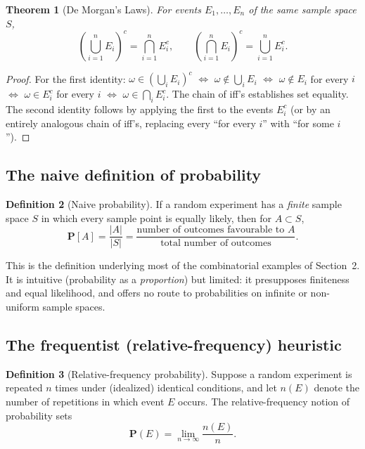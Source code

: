 \documentclass[11pt]{article}
\theoremstyle{definition}
\newtheorem{definition}{Definition}[section]
\theoremstyle{plain}
\newtheorem{theorem}[definition]{Theorem}
\theoremstyle{remark}
\begin{document}
\begin{theorem}[De Morgan's Laws]
For events $E_1,\dots,E_n$ of the same sample space $S$,
\[
\left(\bigcup_{i=1}^n E_i\right)^{\!c} = \bigcap_{i=1}^n E_i^c, \qquad
\left(\bigcap_{i=1}^n E_i\right)^{\!c} = \bigcup_{i=1}^n E_i^c.
\]
\end{theorem}

\begin{proof}
For the first identity: $\omega \in \left(\bigcup_i E_i\right)^c$ $\iff$ $\omega \notin
\bigcup_i E_i$ $\iff$ $\omega \notin E_i$ for every $i$ $\iff$ $\omega \in E_i^c$ for every $i$
$\iff$ $\omega \in \bigcap_i E_i^c$. The chain of iff's establishes set equality. The second
identity follows by applying the first to the events $E_i^c$ (or by an entirely analogous chain of
iff's, replacing every ``for every $i$'' with ``for some $i$'').
\end{proof}

\subsection{The naive definition of probability}
\label{sec:naive-prob}

\begin{definition}[Naive probability]
If a random experiment has a \emph{finite} sample space $S$ in which every sample point is
equally likely, then for $A \subset S$,
\[
\mathbf{P}[A] = \frac{|A|}{|S|} = \frac{\text{number of outcomes favourable to } A}
{\text{total number of outcomes}}.
\]
\end{definition}

This is the definition underlying most of the combinatorial examples of Section~2. It is
intuitive (probability as a \emph{proportion}) but limited: it presupposes finiteness and equal
likelihood, and offers no route to probabilities on infinite or non-uniform sample spaces.

\subsection{The frequentist (relative-frequency) heuristic}

\begin{definition}[Relative-frequency probability]
Suppose a random experiment is repeated $n$ times under (idealized) identical conditions, and let
$n(E)$ denote the number of repetitions in which event $E$ occurs. The relative-frequency notion
of probability sets
\[
\mathbf{P}(E) = \lim_{n \to \infty} \frac{n(E)}{n}.
\]
\end{definition}
\end{document}
